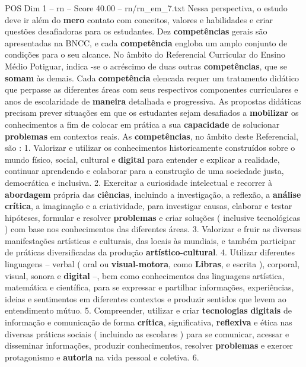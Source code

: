 \begin{textsample}{POS Dim 1 – rn – Score 40.00 – rn/rn\_em\_7.txt}
Nessa perspectiva, o estudo deve ir além do \textbf{mero} contato com conceitos, valores e habilidades e criar questões desafiadoras para os estudantes.
Dez \textbf{competências} gerais são apresentadas na BNCC, e cada \textbf{competência} engloba um amplo conjunto de condições para o seu alcance.
No âmbito do Referencial Curricular do Ensino Médio Potiguar, indica -se o acréscimo de duas outras \textbf{competências}, que se \textbf{somam} às demais.
Cada \textbf{competência} elencada requer um tratamento didático que perpasse as diferentes áreas com seus respectivos componentes curriculares e anos de escolaridade de \textbf{maneira} detalhada e progressiva.
As propostas didáticas precisam prever situações em que os estudantes sejam desafiados a \textbf{mobilizar} os conhecimentos a fim de colocar em prática a sua \textbf{capacidade} de solucionar \textbf{problemas} em contextos reais.
As \textbf{competências}, no âmbito deste Referencial, são : 1.
Valorizar e utilizar os conhecimentos historicamente construídos sobre o mundo físico, social, cultural e \textbf{digital} para entender e explicar a realidade, continuar aprendendo e colaborar para a construção de uma sociedade justa, democrática e inclusiva. 2.
Exercitar a curiosidade intelectual e recorrer à \textbf{abordagem} própria das \textbf{ciências}, incluindo a investigação, a reflexão, a \textbf{análise} \textbf{crítica}, a imaginação e a criatividade, para investigar causas, elaborar e testar hipóteses, formular e resolver \textbf{problemas} e criar soluções ( inclusive tecnológicas ) com base nos conhecimentos das diferentes áreas. 3.
Valorizar e fruir as diversas manifestações artísticas e culturais, das locais às mundiais, e também participar de práticas diversificadas da produção \textbf{artístico-cultural}. 4.
Utilizar diferentes linguagens – verbal ( oral ou \textbf{visual-motora}, como \textbf{Libras}, e escrita ), corporal, visual, sonora e \textbf{digital} –, bem como conhecimentos das linguagens artística, matemática e científica, para se expressar e partilhar informações, experiências, ideias e sentimentos em diferentes contextos e produzir sentidos que levem ao entendimento mútuo. 5.
Compreender, utilizar e criar \textbf{tecnologias} \textbf{digitais} de informação e comunicação de forma \textbf{crítica}, significativa, \textbf{reflexiva} e ética nas diversas práticas sociais ( incluindo as escolares ) para se comunicar, acessar e disseminar informações, produzir conhecimentos, resolver \textbf{problemas} e exercer protagonismo e \textbf{autoria} na vida pessoal e coletiva. 6.

\end{textsample}
